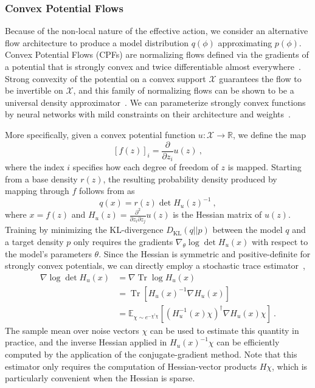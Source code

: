 \documentclass[aps,prd,twocolumn,nofootinbib,superscriptaddress,preprintnumbers]{revtex4-1}
\newcommand{\KL}{\mathrm{KL}}
\DeclareMathOperator{\Tr}{Tr}
\begin{document}
\subsubsection{Convex Potential Flows}
\label{sec:convex-potential-flows}

Because of the non-local nature of the effective action, we consider an alternative flow architecture to produce a model distribution $q(\phi)$ approximating $p(\phi)$. Convex Potential Flows (CPFs) are normalizing flows defined via the gradients of a potential that is strongly convex and twice differentiable almost everywhere~\cite{ZhangEWang2018Monge, huang2020convex}. Strong convexity of the potential on a convex support $\mathcal{X}$ guarantees the flow to be invertible on $\mathcal{X}$, and this family of normalizing flows can be shown to be a universal density approximator~\cite{huang2020convex}. We can parameterize strongly convex functions by neural networks with mild constraints on their architecture and weights~\cite{pmlr-v70-amos17b}.

More specifically, given a convex potential function ${u: \mathcal{X} \rightarrow \mathbb{R}}$, we define the map
%
\begin{equation}\label{eq:CPF}
    [f(z)]_i = \frac{\partial}{\partial z_i} u(z)\ ,
\end{equation}
%
where the index $i$ specifies how each degree of freedom of $z$ is mapped. Starting from a base density $r(z)$, the resulting probability density produced by mapping through $f$ follows from  as
%
\begin{equation}
    q(x) = r(z)\det H_u(z) ^{-1}\ ,
\end{equation}
%
where $x = f(z)$ and $H_u(z)=\frac{\partial^2}{\partial z_i \partial z_j} u(z)$ is the Hessian matrix of $u(z)$. Training by minimizing the KL-divergence $D_{\KL}(q||p)$ between the model $q$ and a target density $p$ only requires the gradients $\nabla_{\theta} \log \det H_u(x)$ with respect to the model's parameters $\theta$. Since the Hessian is symmetric and positive-definite for strongly convex potentials, we can directly employ a stochastic trace estimator~\cite{huang2020convex,dong2017scalable},
%
\begin{equation}\label{eq:grad.log.det.H}
\begin{aligned}
    \nabla \log \det H_u(x) &= \nabla \Tr \log H_u(x) \\
    &= \Tr\left[ H_u(x)^{-1} \nabla H_u(x)\right] \\
    &=\mathbb{E}_{\chi \sim e^{-\chi^\dag \chi}}[(H^{-1}_u(x) \chi)^\dag \nabla H_u(x)\chi]\ .
\end{aligned}
\end{equation}
%
The sample mean over noise vectors $\chi$ can be used to estimate this quantity in practice, and the inverse Hessian applied in $H_u(x)^{-1}\chi$ can be efficiently computed by the application of the conjugate-gradient method. Note that this estimator only requires the computation of Hessian-vector products $H \chi$, which is particularly convenient when the Hessian is sparse.
\end{document}
